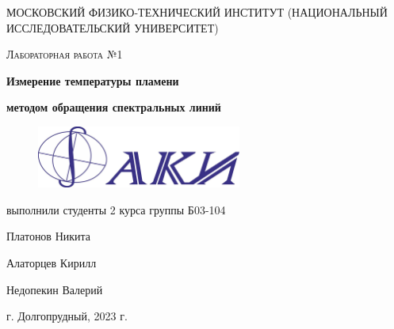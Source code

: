 
\begin{titlepage}
	\centering
	\vspace{5cm}
	{\scshape\LARGE МОСКОВСКИЙ ФИЗИКО-ТЕХНИЧЕСКИЙ ИНСТИТУТ (НАЦИОНАЛЬНЫЙ ИССЛЕДОВАТЕЛЬСКИЙ УНИВЕРСИТЕТ)
 \par}
	\vspace{4cm}
	{\scshape\Large Лабораторная работа №1 \par}
	\vspace{1cm}
	{\huge\bfseries Измерение температуры пламени  \par}
    {\huge\bfseries  методом обращения спектральных линий  \par}
\vspace{1cm}
\begin {figure}[H]
\begin{center}
\includegraphics[width=0.6\textwidth]{faki.png}
\end{center}
\end {figure}
\vspace{1cm}
\begin{flushright}
	{\large выполнили студенты 2 курса группы Б03-104}\par
	\vspace{0.3cm}
	{\LARGE Платонов Никита}\par
    \vspace{0.3cm}
    {\LARGE Алаторцев Кирилл}\par
    \vspace{0.3cm}
    {\LARGE Недопекин Валерий}\par
\end{flushright}
	\vfill
	г. Долгопрудный, 2023 г.
\end{titlepage}
